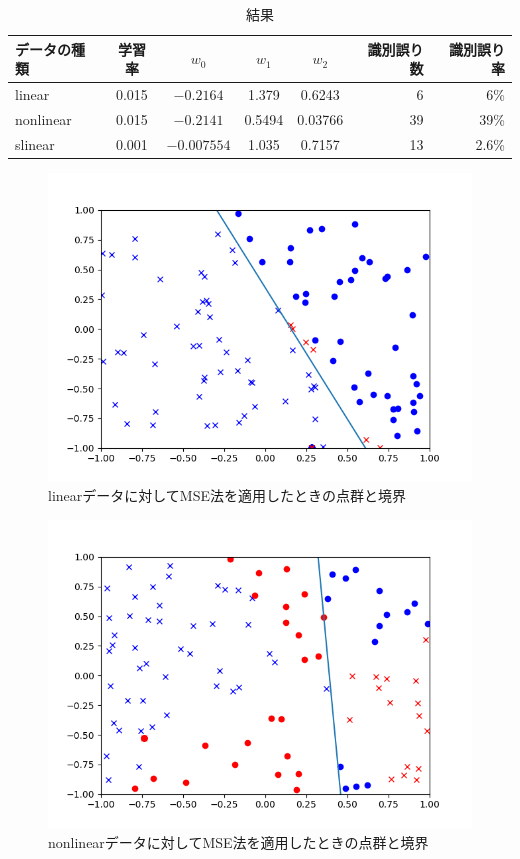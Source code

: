 \documentclass[class=jsarticle, crop=false, dvipdfmx, fleqn]{standalone}
\begin{document}
\begin{table}
    \centering
    \caption{結果}
    \begin{tabular}{lccccrr}
        データの種類 & 学習率 & \(w_0\) & \(w_1\) & \(w_2\) & 識別誤り数 & 識別誤り率 \\ \hline
        linear & 0.015 & \(-0.2164\) & 1.379 & 0.6243 & 6 & 6{\%} \\
        nonlinear & 0.015 & \(-0.2141\) & 0.5494 & 0.03766 & 39 & 39{\%} \\
        slinear & 0.001 & \(-0.007554\) & 1.035 & 0.7157 & 13 & 2.6{\%}
    \end{tabular}
    \label{tab:result2}
\end{table}

\begin{figure}
    \centering
    \includegraphics[clip, width=12cm]{../figures/assignment1_2_linear_result}
    \caption{linearデータに対してMSE法を適用したときの点群と境界}
    \label{fig:result2_linear}
\end{figure}

\begin{figure}
    \centering
    \includegraphics[clip, width=12cm]{../figures/assignment1_2_nonlinear_result}
    \caption{nonlinearデータに対してMSE法を適用したときの点群と境界}
    \label{fig:result2_nonlinear}
\end{figure}
\end{document}
